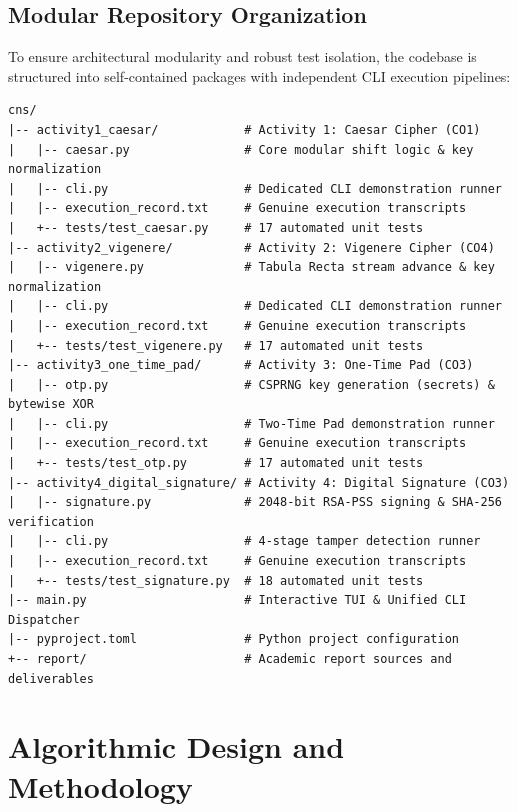 \documentclass[12pt,a4paper]{report}
\begin{document}
\section{Modular Repository Organization}
To ensure architectural modularity and robust test isolation, the codebase is structured into self-contained packages with independent CLI execution pipelines:
\begin{lstlisting}[basicstyle=\ttfamily\scriptsize, aboveskip=4pt, belowskip=4pt]
cns/
|-- activity1_caesar/            # Activity 1: Caesar Cipher (CO1)
|   |-- caesar.py                # Core modular shift logic & key normalization
|   |-- cli.py                   # Dedicated CLI demonstration runner
|   |-- execution_record.txt     # Genuine execution transcripts
|   +-- tests/test_caesar.py     # 17 automated unit tests
|-- activity2_vigenere/          # Activity 2: Vigenere Cipher (CO4)
|   |-- vigenere.py              # Tabula Recta stream advance & key normalization
|   |-- cli.py                   # Dedicated CLI demonstration runner
|   |-- execution_record.txt     # Genuine execution transcripts
|   +-- tests/test_vigenere.py   # 17 automated unit tests
|-- activity3_one_time_pad/      # Activity 3: One-Time Pad (CO3)
|   |-- otp.py                   # CSPRNG key generation (secrets) & bytewise XOR
|   |-- cli.py                   # Two-Time Pad demonstration runner
|   |-- execution_record.txt     # Genuine execution transcripts
|   +-- tests/test_otp.py        # 17 automated unit tests
|-- activity4_digital_signature/ # Activity 4: Digital Signature (CO3)
|   |-- signature.py             # 2048-bit RSA-PSS signing & SHA-256 verification
|   |-- cli.py                   # 4-stage tamper detection runner
|   |-- execution_record.txt     # Genuine execution transcripts
|   +-- tests/test_signature.py  # 18 automated unit tests
|-- main.py                      # Interactive TUI & Unified CLI Dispatcher
|-- pyproject.toml               # Python project configuration
+-- report/                      # Academic report sources and deliverables
\end{lstlisting}

\newpage

\chapter{Algorithmic Design and Methodology}
\end{document}
